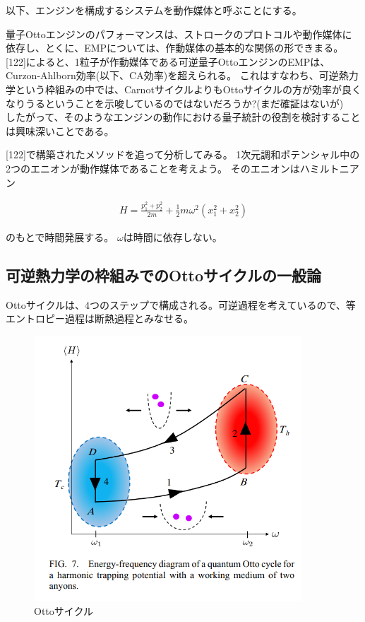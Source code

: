 \documentclass[a4paper,11pt]{jsarticle}
\numberwithin{equation}{section}
\begin{document}
以下、エンジンを構成するシステムを動作媒体と呼ぶことにする。

量子Ottoエンジンのパフォーマンスは、ストロークのプロトコルや動作媒体に依存し、とくに、EMPについては、作動媒体の基本的な関係の形できまる。
[122]によると、1粒子が作動媒体である可逆量子OttoエンジンのEMPは、Curzon-Ahlborn効率(以下、CA効率)を超えられる。
これはすなわち、可逆熱力学という枠組みの中では、CarnotサイクルよりもOttoサイクルの方が効率が良くなりうるということを示唆しているのではないだろうか?(まだ確証はないが)\\
したがって、そのようなエンジンの動作における量子統計の役割を検討することは興味深いことである。

[122]で構築されたメソッドを追って分析してみる。
1次元調和ポテンシャル中の2つのエニオンが動作媒体であることを考えよう。
そのエニオンはハミルトニアン 

\begin{align}
  H=\frac{p_1^2+p_2^2}{2m}+\frac{1}{2}m\omega^2(x_1^2+x_2^2)
\end{align}

のもとで時間発展する。
$\omega$は時間に依存しない。

\subsection{可逆熱力学の枠組みでのOttoサイクルの一般論}
Ottoサイクルは、4つのステップで構成される。可逆過程を考えているので、等エントロピー過程は断熱過程とみなせる。

\begin{figure}[htbp]
  \begin{center}
  \includegraphics[width=100mm]{fig7.png}
  \caption{Ottoサイクル}
  \end{center}
  \end{figure}
\end{document}
